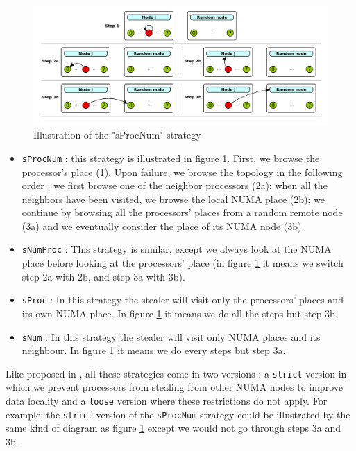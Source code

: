 \documentclass{Styles/llncs}
\begin{document}
\begin{figure}[t]
  \centering
  \includegraphics[scale=0.45]{figures/strategies.pdf}
  \caption{Illustration of the "sProcNum" strategy}
\label{fig:detail-strategy}
\end{figure}
\begin{itemize}
  \item \verb/sProcNum/ : this strategy is illustrated in figure \ref{fig:detail-strategy}.
    First, we browse the processor's place (1). Upon failure, we browse the topology in the following order : we first browse one of the neighbor processors (2a); when all the neighbors have been visited, we browse the local NUMA place (2b); we continue by browsing all the processors' places from a random remote node (3a) and we eventually consider the place of its NUMA node (3b).
  \item \verb/sNumProc/ : This strategy is similar, except we always look at the
    NUMA place before looking at the processors' place (in figure \ref{fig:detail-strategy}
    it means we switch step 2a with 2b, and step 3a with 3b).
  \item \verb/sProc/ : In this strategy the stealer will visit only the
    processors' places and its own NUMA place. In figure \ref{fig:detail-strategy} it means we do
    all the steps but step 3b.
  \item \verb/sNum/ : In this strategy the stealer will visit only NUMA places
    and its neighbour. In figure \ref{fig:detail-strategy} it means we do
    every steps but step 3a.
\end{itemize}

Like proposed in \cite{Olivier:2012:CMW:2388996.2389085}, all these strategies come in two versions : a \verb!strict! version in which we prevent processors from stealing from other NUMA nodes to improve data locality and a \verb!loose! version where these restrictions do not apply.
For example, the \verb!strict! version of the \verb!sProcNum! strategy could be illustrated by the same kind of diagram as figure \ref{fig:detail-strategy} except we would not go through steps 3a and 3b.
\end{document}
